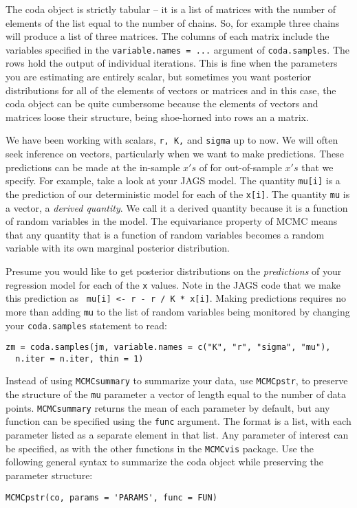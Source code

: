 \documentclass[12pt,english]{article}
\begin{document}
The coda object is strictly tabular -- it is a list of matrices with the number of elements of the list equal to the number of chains. So, for example three chains will produce a list of three matrices.  The columns of  each matrix include the variables specified in the \texttt{variable.names = ...} argument of \texttt{coda.samples}. The rows hold the output of individual iterations. This is fine when the parameters you are estimating are entirely scalar, but sometimes you want posterior distributions for all of the elements of vectors or matrices and in this case, the coda object can be quite cumbersome because the elements of vectors and matrices loose their structure, being shoe-horned into rows an a matrix.

We have been working with scalars, \texttt{r, K,} and \texttt{sigma} up to now.  We will often seek inference on vectors, particularly when we want to make predictions.  These predictions can be made at the in-sample $x's$ of for out-of-sample $x's$ that we specify. For example, take a look at your JAGS model.  The quantity \texttt{mu[i]} is a the prediction of our deterministic model for each of the \texttt{x[i]}.  The quantity \texttt{mu} is a vector, a \emph{derived quantity}.  We call it a derived quantity because it is a function of random variables in the model. The equivariance property of MCMC means that any quantity that is a function of random variables becomes a random variable with its own marginal posterior distribution.

Presume you would like to get posterior distributions on the \emph{predictions} of your regression model for each of the \texttt{x} values. Note in the JAGS code that we make this prediction as \texttt{ mu[i] <- r - r / K * x[i]}. Making predictions requires no more than adding \texttt{mu} to the list of random variables being monitored by changing your \texttt{coda.samples} statement to read:

\begin{Verbatim}
zm = coda.samples(jm, variable.names = c("K", "r", "sigma", "mu"), 
  n.iter = n.iter, thin = 1)
\end{Verbatim}

\noindent Instead of using \texttt{MCMCsummary} to summarize your data, use \texttt{MCMCpstr}, to preserve the structure of the \texttt{mu} parameter a vector of length equal to the number of data points. \texttt{MCMCsummary} returns the mean of each parameter by default, but any function can be specified using the \texttt{func} argument. The format is a list, with each parameter listed as a separate element in that list.  Any parameter of interest can be specified, as with the other functions in the \texttt{MCMCvis} package. Use the following general syntax  to summarize the coda object while preserving the parameter structure:
\begin{Verbatim}
MCMCpstr(co, params = 'PARAMS', func = FUN)
\end{Verbatim}
\end{document}
